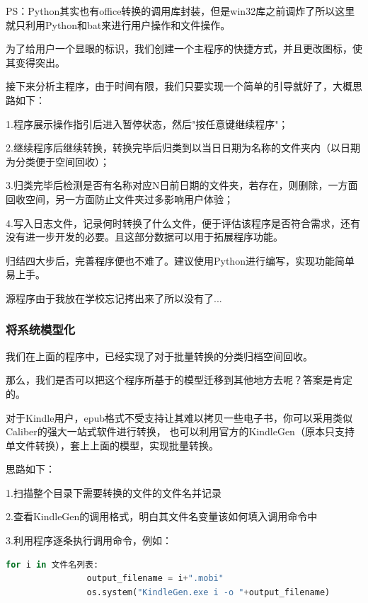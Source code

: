 \documentclass{article}
\begin{document}
        PS：Python其实也有office转换的调用库封装，但是win32库之前调炸了所以这里就只利用Python和bat来进行用户操作和文件操作。

        为了给用户一个显眼的标识，我们创建一个主程序的快捷方式，并且更改图标，使其变得突出。

        接下来分析主程序，由于时间有限，我们只要实现一个简单的引导就好了，大概思路如下：

        1.程序展示操作指引后进入暂停状态，然后"按任意键继续程序"；
        
        2.继续程序后继续转换，转换完毕后归类到以当日日期为名称的文件夹内（以日期为分类便于空间回收）；
        
        3.归类完毕后检测是否有名称对应N日前日期的文件夹，若存在，则删除，一方面回收空间，另一方面防止文件夹过多影响用户体验；

        4.写入日志文件，记录何时转换了什么文件，便于评估该程序是否符合需求，还有没有进一步开发的必要。且这部分数据可以用于拓展程序功能。

        归结四大步后，完善程序便也不难了。建议使用Python进行编写，实现功能简单易上手。

        源程序由于我放在学校忘记拷出来了所以没有了...
        
        \subsubsection{将系统模型化}
        我们在上面的程序中，已经实现了对于批量转换的分类归档空间回收。

        那么，我们是否可以把这个程序所基于的模型迁移到其他地方去呢？答案是肯定的。

        对于Kindle用户，epub格式不受支持让其难以拷贝一些电子书，你可以采用类似Caliber的强大一站式软件进行转换，
        也可以利用官方的KindleGen（原本只支持单文件转换），套上上面的模型，实现批量转换。

        思路如下：

        1.扫描整个目录下需要转换的文件的文件名并记录

        2.查看KindleGen的调用格式，明白其文件名变量该如何填入调用命令中
        
        3.利用程序逐条执行调用命令，例如：
        
        \begin{lstlisting}[language={python}]
            for i in 文件名列表:
                output_filename = i+".mobi"
                os.system("KindleGen.exe i -o "+output_filename)
        \end{lstlisting}
\end{document}
